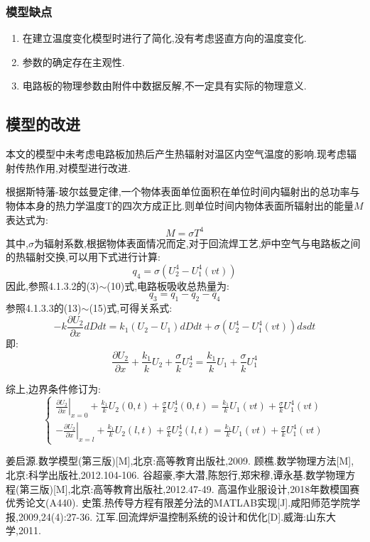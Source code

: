 \documentclass[12pt]{ctexart}
\numberwithin{figure}{section}
\numberwithin{table}{section}
\begin{document}
\subsubsection{模型缺点}
\begin{enumerate}
    \item 在建立温度变化模型时进行了简化,没有考虑竖直方向的温度变化.
    \item 参数的确定存在主观性.
    \item 电路板的物理参数由附件中数据反解,不一定具有实际的物理意义.
\end{enumerate}
\subsection{模型的改进}
本文的模型中未考虑电路板加热后产生热辐射对温区内空气温度的影响.现考虑辐射传热作用,对模型进行改进.


根据斯特藩-玻尔兹曼定律,一个物体表面单位面积在单位时间内辐射出的总功率与物体本身的热力学温度T的四次方成正比.则单位时间内物体表面所辐射出的能量$M$表达式为\cite{6}:
\begin{equation}
    M=\sigma T^4
\end{equation}
其中,$\sigma$为辐射系数,根据物体表面情况而定,对于回流焊工艺,炉中空气与电路板之间的热辐射交换,可以用下式进行计算:
\begin{equation}
    q_4=\sigma(U_2^4-U_1^4(vt))
\end{equation}
因此,参照4.1.3.2的(3)$\sim$(10)式,电路板吸收总热量为:
\begin{equation}
    q_3=q_1-q_2-q_4
\end{equation}
参照4.1.3.3的(13)$\sim$(15)式,可得关系式:
\begin{equation}
-k\frac{\partial U_2}{\partial x}dDdt=k_1(U_2-U_1)dDdt+\sigma(U_2^4-U_1^4(vt))dsdt
\end{equation}
即:
\begin{equation}
\frac{\partial U_2}{\partial x}+\frac{k_1}{k}U_2+\frac{\sigma}{k}U_2^4=\frac{k_1}{k}U_1+\frac{\sigma}{k}U_1^4
\end{equation}

综上,边界条件修订为:
\begin{equation}
\left\{
\begin{array}{cc}
   \left.\frac{\partial U_2}{\partial x}\right|_{x=0}+\frac{k_1}{k}U_2(0,t)+\frac{\sigma}{k}U_2^4(0,t)=\frac{k_1}{k}U_1(vt)+\frac{\sigma}{k}U_1^4(vt)\\
  -\left.\frac{\partial U_2}{\partial x}\right|_{x=l}+\frac{k_1}{k}U_2(l,t)+\frac{\sigma}{k}U_2^4(l,t)=\frac{k_1}{k}U_1(vt)+\frac{\sigma}{k}U_1^4(vt)
\end{array}\right.
\end{equation}
\begin{thebibliography}{99}
姜启源.数学模型(第三版)[M],北京:高等教育出版社,2009.
顾樵.数学物理方法[M],北京:科学出版社,2012.104-106.
谷超豪,李大潜,陈恕行,郑宋穆,谭永基.数学物理方程(第三版)[M],北京:高等教育出版社,2012.47-49.
高温作业服设计,2018年数模国赛优秀论文(A440).
史策.热传导方程有限差分法的MATLAB实现[J].咸阳师范学院学报,2009,24(4):27-36.
江军.回流焊炉温控制系统的设计和优化[D].威海:山东大学,2011.

\end{thebibliography}
\newpage
\appendix
\end{document}
